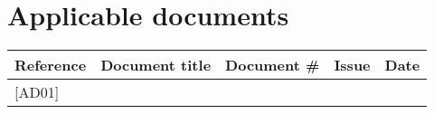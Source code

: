 \section*{Applicable documents}
\begin{table}[htp]
\centering
\renewcommand{\arraystretch}{1.2} %
\begin{tabularx}{\textwidth}{|l|X|l|l|l|}
\hline
Reference & Document title & Document \# & Issue & Date \\
\hline
{[}AD01{]} & & & & \\
\hline
\end{tabularx}
\end{table}
